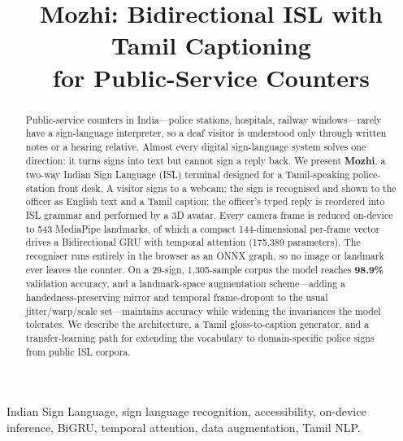 \documentclass[conference]{IEEEtran}
\begin{document}
\title{Mozhi: Bidirectional ISL with Tamil Captioning\\for Public-Service Counters}

\author{
\and
{}
}

\maketitle

\begin{abstract}
Public-service counters in India---police stations, hospitals, railway
windows---rarely have a sign-language interpreter, so a deaf visitor is
understood only through written notes or a hearing relative. Almost every
digital sign-language system solves one direction: it turns signs into text
but cannot sign a reply back. We present \textbf{Mozhi}, a two-way Indian Sign
Language (ISL) terminal designed for a Tamil-speaking police-station front
desk. A visitor signs to a webcam; the sign is recognised and shown to the
officer as English text and a Tamil caption; the officer's typed reply is
reordered into ISL grammar and performed by a 3D avatar. Every camera frame is
reduced on-device to 543 MediaPipe landmarks, of which a compact 144-dimensional
per-frame vector drives a Bidirectional GRU with temporal attention
(175{,}389 parameters). The recogniser runs entirely in the browser as an ONNX
graph, so no image or landmark ever leaves the counter. On a 29-sign, 1{,}305-sample
corpus the model reaches \textbf{98.9\%} validation accuracy, and a
landmark-space augmentation scheme---adding a handedness-preserving mirror and
temporal frame-dropout to the usual jitter/warp/scale set---maintains accuracy
while widening the invariances the model tolerates. We describe the
architecture, a Tamil gloss-to-caption generator, and a transfer-learning path
for extending the vocabulary to domain-specific police signs from public ISL
corpora.
\end{abstract}

\begin{IEEEkeywords}
Indian Sign Language, sign language recognition, accessibility, on-device
inference, BiGRU, temporal attention, data augmentation, Tamil NLP.
\end{IEEEkeywords}
\end{document}
